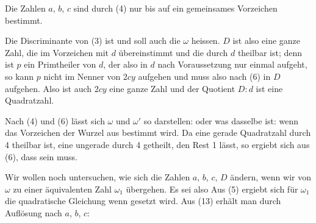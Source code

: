 Die Zahlen $a$, $b$, $c$ sind durch (4) nur bis auf ein gemeinsames Vorzeichen bestimmt.

Die Discriminante von (3) ist
und soll auch die  $\omega$ heissen. $D$ ist also eine ganze Zahl, die im Vorzeichen mit $d$ übereinstimmt und die durch $d$ theilbar ist; denn ist $p$ ein Primtheiler von $d$, der also in $d$ nach Voraussetzung nur einmal aufgeht, so kann $p$ nicht im Nenner von $2cy$ aufgehen und muss also nach (6) in $D$ aufgehen. Also ist auch $2cy$ eine ganze Zahl und der Quotient $D:d$ ist eine Quadratzahl.

Nach (4) und (6) lässt sich $\omega$ und $\omega'$ so darstellen:
oder was dasselbe ist:
wenn das Vorzeichen der Wurzel aus
bestimmt wird. Da eine gerade Quadratzahl durch 4 theilbar ist, eine ungerade durch 4 getheilt, den Rest 1 lässt, so ergiebt sich aus (6), dass
sein muss.

Wir wollen noch untersuchen, wie sich die Zahlen $a$, $b$, $c$, $D$ ändern, wenn wir von $\omega$ zu einer äquivalenten Zahl $\omega_1$ übergehen. Es sei also
Aus (5) ergiebt sich für $\omega_1$ die quadratische Gleichung
wenn
gesetzt wird. Aus (13) erhält man durch Auflösung nach $a$, $b$, $c$:
